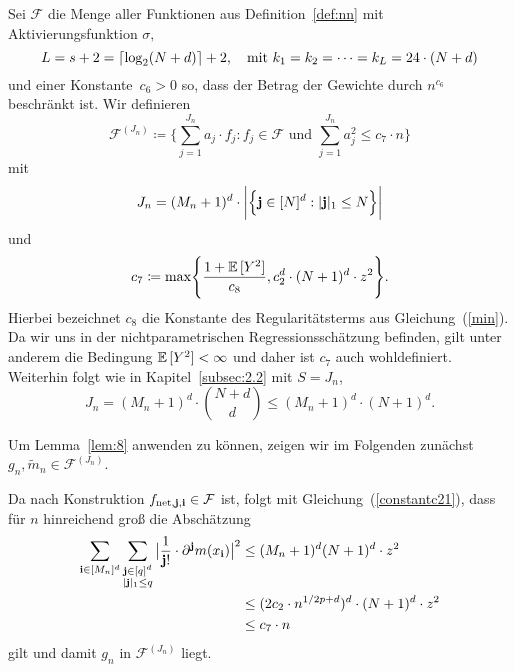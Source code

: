 Sei $\mathcal{F}$ die Menge aller Funktionen aus Definition~\ref{def:nn} mit Aktivierungsfunktion $\sigma,$ $$L = s + 2 = \lceil\log_2(N + d)\rceil + 2, \text{\quad mit } k_1 = k_2 = \cdots = k_L = 24 \cdot (N + d)$$ und einer Konstante~$c_6 > 0$ so, dass der Betrag der Gewichte durch $n^{c_{6}}$ beschränkt ist. Wir definieren
$$ \mathcal{F}^{(J_n)} \coloneqq \biggl\{\sum_{j = 1}^{J_n} a_j \cdot f_j : f_j \in \mathcal{F} \text{ und } \sum_{j = 1}^{J_n} a_j^2 \leq c_7 \cdot n \biggr\}$$
mit 
$$
J_n = (M_n + 1)^d \cdot \bigg|\Bigl\{\mathbf{j} \in [N]^d : |\mathbf{j}|_1 \leq N \Bigr\}\bigg|$$
und
\begin{equation}
\label{constantc21}
\begin{split}
c_7 \coloneqq \max\Biggl\{\frac{1 + \mathbb{E}\,[Y^2]}{c_8}, c_2^d \cdot (N + 1)^d \cdot z^2\Biggr\}.
\end{split}
\end{equation}
Hierbei bezeichnet $c_8$ die Konstante des Regularitätsterms aus Gleichung~(\ref{min}). Da wir uns in der nichtparametrischen Regressionsschätzung befinden, gilt unter anderem die Bedingung $\mathbb{E}\,[Y^2] < \infty$ und daher ist $c_7$ auch wohldefiniert. 
Weiterhin folgt wie in Kapitel~\ref{subsec:2.2} mit $S = J_n$,
\begin{equation}
\label{jn}
J_n =  (M_n + 1)^d \cdot \binom{N + d}{d} \leq (M_n + 1)^d \cdot (N + 1)^d.
\end{equation}

Um Lemma~\ref{lem:8} anwenden zu können, zeigen wir im Folgenden zunächst $g_n, \tilde{m}_n \in \mathcal{F}^{(J_n)}.$

Da nach Konstruktion $f_{\mathrm{net},\mathbf{j},\mathbf{i}} \in \mathcal{F}$ ist, folgt mit Gleichung~(\ref{constantc21}), dass für $n$ hinreichend groß die Abschätzung
\begin{equation*}
\begin{split}
\sum_{\mathbf{i} \in [M_n]^d} \sum_{\substack{ \mathbf{j} \in [q]^d \\ |\mathbf{j}|_1  \leq q}} \big| \frac{1}{\mathbf{j}!} \cdot \partial^{\mathbf{j}}m(x_{\mathbf{i}})\big|^2 
& \leq (M_n + 1)^d (N + 1)^d \cdot z^2 \\
& \leq (2 c_2 \cdot n^{1/2p + d})^d \cdot (N + 1)^d \cdot z^2 \\
& \leq c_7 \cdot n
\end{split}
\end{equation*}
gilt und damit $g_n$ in $\mathcal{F}^{(J_n)}$ liegt. 

